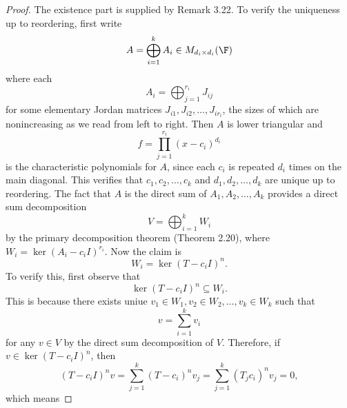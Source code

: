 \documentclass[math_245.tex]{subfiles}
\begin{document}
    \begin{proof}
        The existence part is supplied by Remark 3.22. To verify the uniqueness up to reordering, first write
        \begin{equation*}
            A = \bigoplus^{k}_{i=1} A_i\in M_{d_i\times d_i}(\F) 
        \end{equation*}
        where each
        \begin{equation*}
            A_i = \bigoplus^{r_i}_{j=1} J_{ij}
        \end{equation*}
        for some elementary Jordan matrices $J_{i 1}, J_{i 2}, \ldots, J_{ir_i}$, the sizes of which are nonincreasing as we read from left to right. Then $A$ is lower triangular and
        \begin{equation*}
            f = \prod^{r_i}_{j=1} \left( x-c_i \right) ^{d_i}
        \end{equation*}
        is the characteristic polynomials for $A$, since each $c_i$ is repeated $d_i$ times on the main diagonal. This verifies that $c_1,c_2,\ldots,c_k$ and $d_1,d_2,\ldots,d_k$ are unique up to reordering. The fact that $A$ is the direct sum of $A_1,A_2,\ldots,A_k$ provides a direct sum decomposition
        \begin{equation*}
            V = \bigoplus^{k}_{i=1} W_i
        \end{equation*}
        by the primary decomposition theorem (Theorem 2.20), where $W_i = \ker\left( A_i-c_iI \right) ^{r_i}$. Now the claim is
        \begin{equation*}
            W_i = \ker\left( T-c_iI \right) ^n.
        \end{equation*}
        To verify this, first observe that
        \begin{equation*}
            \ker\left( T-c_iI \right) ^n \subseteq W_i.
        \end{equation*}
        This is because there exists uniue $v_1\in W_1, v_2\in W_2,\ldots, v_k\in W_k$ such that
        \begin{equation*}
            v = \sum^{k}_{i=1} v_i
        \end{equation*}
        for any $v\in V$ by the direct sum decomposition of $V$. Therefore, if $v\in\ker\left( T-c_iI \right) ^n$, then
        \begin{equation*}
            \left( T-c_iI \right) ^nv = \sum^{k}_{j=1} \left( T-c_i \right)^nv_j = \sum^{k}_{j=1} \left( T_jc_i \right)^n v_j = 0, 
        \end{equation*}
        which means

\end{proof}
\end{document}
